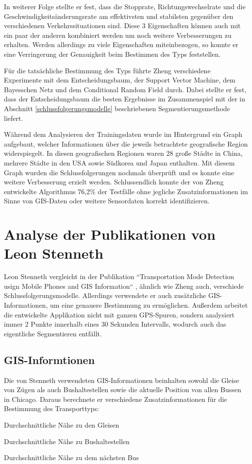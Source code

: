 In weiterer Folge stellte er fest, dass die Stopprate, Richtungswechselrate und die Geschwindigkeitsänderungsrate am effektivsten und stabilsten gegenüber den verschiedenen Verkehrssituationen sind. Diese 3 Eigenschaften können auch mit ein paar der anderen kombiniert werden um noch weitere Verbesserungen zu erhalten. Werden allerdings zu viele Eigenschaften miteinbezogen, so konnte er eine Verringerung der Genauigkeit beim Bestimmen des Typs feststellen. 

Für die tatsächliche Bestimmung des Typs führte Zheng verschiedene Experimente mit dem Entscheidungsbaum, der Support Vector Machine, dem Bayesschen Netz und dem Conditional Random Field durch. Dabei stellte er fest, dass der Entscheidungsbaum die besten Ergebnisse im Zusammenspiel mit der in Abschnitt \ref{schlussfolgerungsmodelle} beschriebenen Segmentierungsmethode liefert. 

Während dem Analysieren der Trainingsdaten wurde im Hintergrund ein Graph aufgebaut, welcher Informationen über die jeweils betrachtete geografische Region widerspiegelt. In diesen geografischen Regionen waren 28 große Städte in China, mehrere Städte in den USA sowie Südkorea und Japan enthalten. Mit diesem Graph wurden die Schlussfolgerungen nochmals überprüft und es konnte eine weitere Verbesserung erzielt werden. Schlussendlich konnte der von Zheng entwickelte Algorithmus 76,2\% der Testfälle ohne jegliche Zusatzinformationen im Sinne von GIS-Daten oder weitere Sensordaten korrekt identifizieren.

\section{Analyse der Publikationen von Leon Stenneth}
Leon Stenneth vergleicht in der Publikation ``Transportation Mode Detection usign Mobile Phones and GIS Information`` \cite{stenneth_transportation_2011}, ähnlich wie Zheng auch, verschiede Schlussfolgerungsmodelle. Allerdings verwendete er auch zusätzliche GIS-Informationen, um eine genauere Bestimmung zu ermöglichen. Außerdem arbeitet die entwickelte Applikation nicht mit ganzen GPS-Spuren, sondern analysiert immer 2 Punkte innerhalb eines 30 Sekunden Intervalls, wodurch auch das eigentliche Segmentieren entfällt.

\subsection{GIS-Informtionen}
Die von Stenneth verwendeten GIS-Informationen beinhalten sowohl die Gleise von Zügen als auch Bushaltestellen sowie die aktuelle Position von allen Bussen in Chicago. Daraus berechnete er verschiedene Zusatzinformationen für die Bestimmung des Transporttyps:
\begin{pitemize}
\item Durchschnittliche Nähe zu den Gleisen
\item Durchschnittliche Nähe zu Bushaltestellen
\item Durchschnittliche Nähe zu dem nächsten Bus
\end{pitemize}

